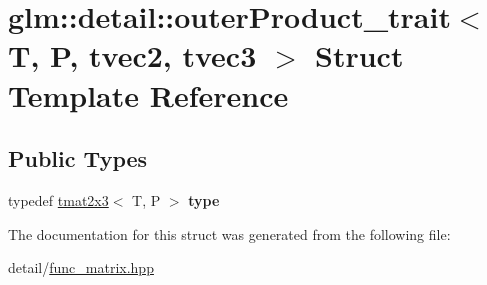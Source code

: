 \hypertarget{structglm_1_1detail_1_1outerProduct__trait_3_01T_00_01P_00_01tvec2_00_01tvec3_01_4}{\section{glm\-:\-:detail\-:\-:outer\-Product\-\_\-trait$<$ T, P, tvec2, tvec3 $>$ Struct Template Reference}
\label{structglm_1_1detail_1_1outerProduct__trait_3_01T_00_01P_00_01tvec2_00_01tvec3_01_4}
}
\subsection*{Public Types}
\begin{DoxyCompactItemize}
\item 
\hypertarget{structglm_1_1detail_1_1outerProduct__trait_3_01T_00_01P_00_01tvec2_00_01tvec3_01_4_a960af058d12b8de3d79562804f768d0d}{typedef \hyperlink{structglm_1_1tmat2x3}{tmat2x3}$<$ T, P $>$ {\bfseries type}}\label{structglm_1_1detail_1_1outerProduct__trait_3_01T_00_01P_00_01tvec2_00_01tvec3_01_4_a960af058d12b8de3d79562804f768d0d}

\end{DoxyCompactItemize}


The documentation for this struct was generated from the following file\-:\begin{DoxyCompactItemize}
\item 
detail/\hyperlink{func__matrix_8hpp}{func\-\_\-matrix.\-hpp}\end{DoxyCompactItemize}
